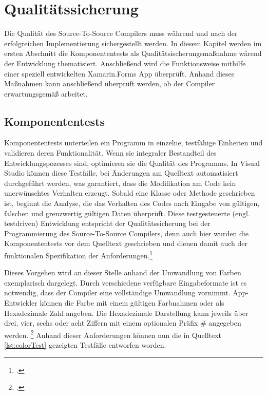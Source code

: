 \chapter{Qualitätssicherung}
\label{chap:Qualitätssicherung}
Die Qualität des Source-To-Source Compilers muss während und nach der erfolgreichen Implementierung sichergestellt werden. In diesem Kapitel werden im ersten Abschnitt die Komponententests als Qualitätsischerungsmaßnahme wärend der Entwicklung thematisiert.  Anschließend wird die Funktionsweise mithilfe einer speziell entwickelten Xamarin.Forms App überprüft.  Anhand dieses Maßnahmen kann anschließend überprüft werden, ob  der Compiler erwartungsgemäß arbeitet. 

\section{Komponententests}
Komponententests unterteilen ein Programm in einzelne,  testfähige Einheiten und validieren deren Funktionalität.  Wenn sie integraler Bestandteil des Entwicklungspozesses sind,  optimieren sie die Qualität des Programms.  In Visual Studio können diese Testfälle, bei Änderungen am Quelltext automatisiert durchgeführt 
werden, was garantiert, dass die Modifikation am Code kein unerwünschtes Verhalten erzeugt.   Sobald eine Klasse oder Methode geschrieben ist, beginnt die Analyse, die das Verhalten des Codes nach Eingabe von gültigen, falschen und grenzwertig gültigen Daten überprüft. 
Diese testgesteuerte (engl. testdriven) Entwicklung entspricht der Qualitätssicherung bei 
der Programmierung des Source-To-Source Compilers, denn auch hier wurden die Komponententests vor dem Quelltext geschrieben und dienen damit auch der funktionalen Spezifikation der Anforderungen.\footcite[Vgl.][Abgerufen am \today]{MicrosoftColor} 

Dieses Vorgehen wird an dieser Stelle anhand der Umwandlung von Farben exemplarisch dargelegt.  Durch verschiedene verfügbare Eingabeformate ist es notwendig,  dass der Compiler eine vollständige Umwandlung vornimmt.  App-Entwickler können die Farbe mit einem gültigen Farbnahmen oder als Hexadezimale Zahl angeben.  Die Hexadezimale Darstellung kann jeweils über drei, vier,  sechs oder acht Ziffern mit einem optionalen Präfix \# angegeben werden. \footcite[Vgl.][Abgerufen am \today]{MicrosoftColor} 
Anhand dieser Anforderungen können nun die in Quelltext \ref{lst:colorTest} gezeigten Testfälle entworfen worden.



